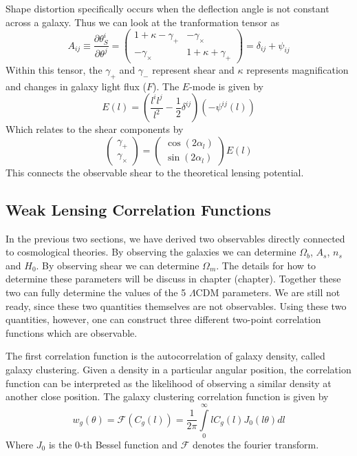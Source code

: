 Shape distortion specifically occurs when the deflection angle is not constant across a galaxy. Thus we can look at the tranformation tensor as
\begin{equation}
	A_{ij} \equiv \frac{\partial \theta^i_S}{\partial\theta^j} = \left( 
	\begin{array}{cc}
	1+\kappa - \gamma_+ & -\gamma_\times \\
	-\gamma_\times & 1+\kappa+\gamma_+
	\end{array}
	\right) = \delta_{ij}+\psi_{ij}
\end{equation}
Within this tensor, the $\gamma_+$ and $\gamma_-$ represent shear and $\kappa$ represents magnification and changes in galaxy light flux ($F$). The $E$-mode is given by
\begin{equation}
	E(l) = \left( \frac{l^il^j}{l^2} - \frac{1}{2}\delta^{ij} \right)(-\psi^{ij}(l))
\end{equation}
Which relates to the shear components by
\begin{equation}
	\left(
	\begin{array}{c}
	\gamma_+ \\
	\gamma_\times
	\end{array}
	\right)
	=
	\left(
	\begin{array}{c}
	\cos(2\alpha_l) \\
	\sin(2\alpha_l)
	\end{array}
	\right)
	E(l)
\end{equation}
This connects the observable shear to the theoretical lensing potential.
\subsection{Weak Lensing Correlation Functions}
In the previous two sections, we have derived two observables directly connected to cosmological theories. By observing the galaxies we can determine $\Omega_b$, $A_s$, $n_s$ and $H_0$. By observing shear we can determine $\Omega_m$. The details for how to determine these parameters will be discuss in chapter (chapter). Together these two can fully determine the values of the 5 $\Lambda$CDM parameters. We are still not ready, since these two quantities themselves are not observables. Using these two quantities, however, one can construct three different two-point correlation functions which are observable.

The first correlation function is the autocorrelation of galaxy density, called galaxy clustering. Given a density in a particular angular position, the correlation function can be interpreted as the likelihood of observing a similar density at another close position. The galaxy clustering correlation function is given by
\begin{equation}
	w_g(\theta) = \mathcal{F}(C_g(l)) = \frac{1}{2\pi}\int\limits_0^\infty l C_g(l) J_0(l\theta)dl
\end{equation}
Where $J_0$ is the 0-th Bessel function and $\mathcal{F}$ denotes the fourier transform.

